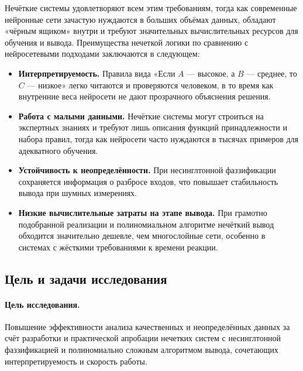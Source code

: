 Нечёткие системы удовлетворяют всем этим требованиям, тогда как современные нейронные сети зачастую нуждаются в больших объёмах данных, обладают «чёрным ящиком» внутри и требуют значительных вычислительных ресурсов для обучения и вывода. Преимущества нечеткой логики по сравнению с нейросетевыми подходами заключаются в следующем:
\begin{itemize}
  \item \textbf{Интерпретируемость.} Правила вида «Если $A$ — высокое, а $B$ — среднее, то $C$ — низкое» легко читаются и проверяются человеком, в то время как внутренние веса нейросети не дают прозрачного объяснения решения.
  \item \textbf{Работа с малыми данными.} Нечёткие системы могут строиться на экспертных знаниях и требуют лишь описания функций принадлежности и набора правил, тогда как нейросети часто нуждаются в тысячах примеров для адекватного обучения.
  \item \textbf{Устойчивость к неопределённости.} При несинглтонной фаззификации сохраняется информация о разбросе входов, что повышает стабильность вывода при шумных измерениях.
  \item \textbf{Низкие вычислительные затраты на этапе вывода.} При грамотно подобранной реализации и полиномиальном алгоритме нечёткий вывод обходится значительно дешевле, чем многослойные сети, особенно в системах с жёсткими требованиями к времени реакции.
\end{itemize}

\subsection{Цель и задачи исследования}

\paragraph{Цель исследования.} 

Повышение эффективности анализа качественных и неопределённых данных за счёт разработки и практической апробации нечетких систем с несинглтонной фаззификацией и полиномиально сложным алгоритмом вывода, сочетающих интерпретируемость и скорость работы.

